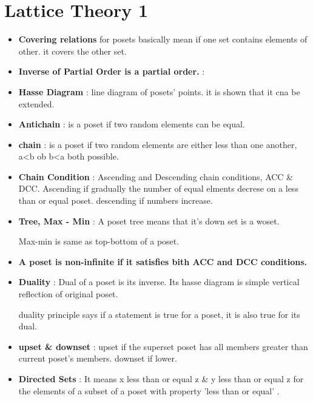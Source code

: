 \chapter{Lattice Theory 1}


\begin{itemize}

	\item{\textbf{Covering relations} for posets basically mean if one set contains elements of other. it covers the other set.}
	\item{\textbf{Inverse of Partial Order is a partial order.} :
	}

	\item{\textbf{Hasse Diagram} : line diagram of posets' points. it is shown that it cna be extended.
	}

	\item{\textbf{Antichain} : is a poset if two random elements can be equal.
	}

	\item{\textbf{chain} : is a poset if two random elements are either less than one another, a<b ob b<a both possible.
	}

	\item{\textbf{Chain Condition} : Ascending and Descending chain conditions, ACC \& DCC. Ascending if gradually the number of equal elments decrese on a less than or equal poset. descending if numbers increase.
	}

	\item{\textbf{Tree, Max - Min} : A poset tree means that it's down set is a woset.

	Max-min is same as top-bottom of a poset. 
	}

	\item{\textbf{A poset is non-infinite if it satisfies bith ACC and DCC conditions.}}

	\item{\textbf{Duality} : Dual of a poset is its inverse. Its hasse diagram is simple vertical reflection of original poset.

	duality principle says if a statement is true for a poset, it is also true for its dual.
	}

	\item{\textbf{ upset \& downset} :
	upset if the superset poset has all members greater than current poset's members. downset if lower.
	}

	\item{\textbf{ Directed Sets} :
	It means x less than or equal z \& y less than or equal z for the elements of a subset of a poset with property 'less than or equal' .
	}


\end{itemize}
